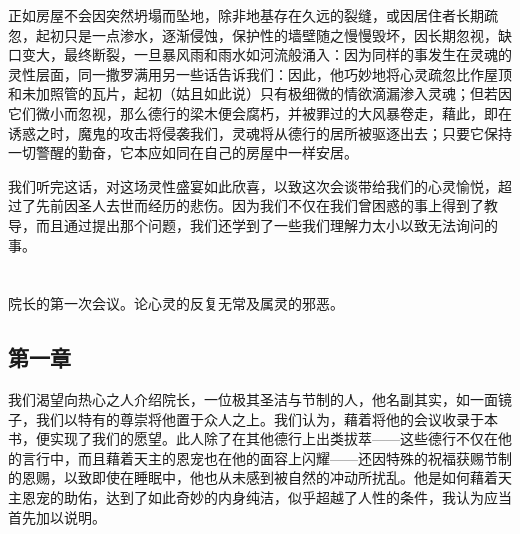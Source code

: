 \par

正如房屋不会因突然坍塌而坠地，除非地基存在久远的裂缝，或因居住者长期疏忽，起初只是一点渗水，逐渐侵蚀，保护性的墙壁随之慢慢毁坏，因长期忽视，缺口变大，最终断裂，一旦暴风雨和雨水如河流般涌入：因为同样的事发生在灵魂的灵性层面，同一撒罗满用另一些话告诉我们：因此，他巧妙地将心灵疏忽比作屋顶和未加照管的瓦片，起初（姑且如此说）只有极细微的情欲滴漏渗入灵魂；但若因它们微小而忽视，那么德行的梁木便会腐朽，并被罪过的大风暴卷走，藉此，即在诱惑之时，魔鬼的攻击将侵袭我们，灵魂将从德行的居所被驱逐出去；只要它保持一切警醒的勤奋，它本应如同在自己的房屋中一样安居。\par

我们听完这话，对这场灵性盛宴如此欣喜，以致这次会谈带给我们的心灵愉悦，超过了先前因圣人去世而经历的悲伤。因为我们不仅在我们曾困惑的事上得到了教导，而且通过提出那个问题，我们还学到了一些我们理解力太小以致无法询问的事。\par



\section{}

\par

院长的第一次会议。论心灵的反复无常及属灵的邪恶。\par


\subsection{第一章}

\par

我们渴望向热心之人介绍院长，一位极其圣洁与节制的人，他名副其实，如一面镜子，我们以特有的尊崇将他置于众人之上。我们认为，藉着将他的会议收录于本书，便实现了我们的愿望。此人除了在其他德行上出类拔萃——这些德行不仅在他的言行中，而且藉着天主的恩宠也在他的面容上闪耀——还因特殊的祝福获赐节制的恩赐，以致即使在睡眠中，他也从未感到被自然的冲动所扰乱。他是如何藉着天主恩宠的助佑，达到了如此奇妙的内身纯洁，似乎超越了人性的条件，我认为应当首先加以说明。\par

